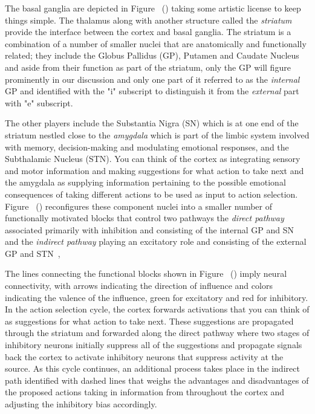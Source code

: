 
The basal ganglia are depicted in Figure~{} ({}) taking some artistic license to keep things simple. The thalamus along with another structure called the {\it{striatum}} provide the interface between the cortex and basal ganglia. The striatum is a combination of a number of smaller nuclei that are anatomically and functionally related; they include the Globus Pallidus (GP), Putamen and Caudate Nucleus and aside from their function as part of the striatum, only the GP will figure prominently in our discussion and only one part of it \emdash{} referred to as the {\it{internal}} GP and identified with the "i" subscript to distinguish it from the {\it{external}} part with "e" subscript.

The other players include the Substantia Nigra (SN) which is at one end of the striatum nestled close to the {\it{amygdala}} which is part of the limbic system involved with memory, decision-making and modulating emotional responses, and the Subthalamic Nucleus (STN). You can think of the cortex as integrating sensory and motor information and making suggestions for what action to take next and the amygdala as supplying information pertaining to the possible emotional consequences of taking different actions to be used as input to action selection. Figure~{} ({}) reconfigures these component nuclei into a smaller number of functionally motivated blocks that control two pathways \emdash{} the {\it{direct pathway}} associated primarily with inhibition and consisting of the internal GP and SN and the {\it{indirect pathway}} playing an excitatory role and consisting of the external GP and STN~\cite{OReillyetalCCN-12,WangetalNATURE-NEUROSCIENCE-18},

The lines connecting the functional blocks shown in Figure~{} ({}) imply neural connectivity, with arrows indicating the direction of influence and colors indicating the valence of the influence, green for excitatory and red for inhibitory. In the action selection cycle, the cortex forwards activations that you can think of as suggestions for what action to take next. These suggestions are propagated through the striatum and forwarded along the direct pathway where two stages of inhibitory neurons initially suppress all of the suggestions and propagate signals back the cortex to activate inhibitory neurons that suppress activity at the source. As this cycle continues, an additional process takes place in the indirect path \emdash{} identified with dashed lines \emdash{} that weighs the advantages and disadvantages of the proposed actions taking in information from throughout the cortex and adjusting the inhibitory bias accordingly.

